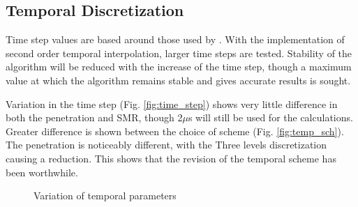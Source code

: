 \documentclass[a4paper,10pt]{article}
\begin{document}
\subsection{Temporal Discretization} %
Time step values are based around those used by \cite{beck2002}. With the implementation of second order temporal interpolation, larger time steps are tested. Stability of the algorithm will be reduced with the increase of the time step, though a maximum value at which the algorithm remains stable and gives accurate results is sought.

Variation in the time step (Fig. \ref{fig:time_step}) shows very little difference in both the penetration and SMR, though 2$\mu$s will still be used for the calculations. Greater difference is shown between the choice of scheme (Fig. \ref{fig:temp_sch}). The penetration is noticeably different, with the Three levels discretization causing a reduction. This shows that the revision of the temporal scheme has been worthwhile.
\begin{figure}[H]
\centering
{}
\caption{Variation of temporal parameters}
\label{fig:temp_disc}
\end{figure}
\end{document}
